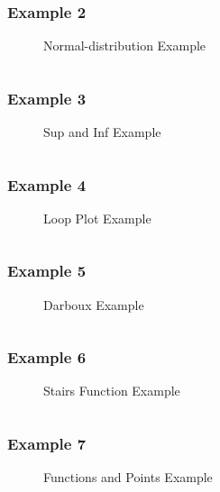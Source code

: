\documentclass[
  hyper,    
  lang=cn,
  class=book,
  bib_index={load},
  mathSpec={envStyle=leftbar, alias},
  toc={column=2, title=目录},
]{zlatex}
\begin{document}
\subsubsection{Example 2}
\begin{figure}[!htb]
    \centering
    
    \caption{Normal-distribution Example}
    \label{fig:2-norm-distribution}
\end{figure}
\inputminted{latex}{./example_2.tex}
\newpage


\subsubsection{Example 3}
\begin{figure}[!htb]
    \centering
    
    \caption{Sup and Inf Example}
    \label{fig:3-sup-inf}
\end{figure}
\inputminted{latex}{./example_3.tex}
\newpage


\subsubsection{Example 4}
\begin{figure}[!htb]
    \centering
    
    \caption{Loop Plot Example}
    \label{fig:4-loop-to-plot-function}
\end{figure}
\inputminted{latex}{./example_4.tex}
\newpage

\subsubsection{Example 5}
\begin{figure}[!htb]
    \centering
    
    \caption{Darboux Example}
    \label{fig:5-darboux-function}
\end{figure}
\inputminted{latex}{./example_5.tex}
\newpage


\subsubsection{Example 6}
\begin{figure}[!htb]
    \centering
    
    \caption{Stairs Function Example}
    \label{fig:6-stairs-function}
\end{figure}
\inputminted{latex}{./example_6.tex}
\newpage


\subsubsection{Example 7}
\begin{figure}[!htb]
    \centering
    
    \caption{Functions and Points Example}
    \label{fig:7-points-function}
\end{figure}
\inputminted{latex}{./example_7.tex}
\newpage
\end{document}
